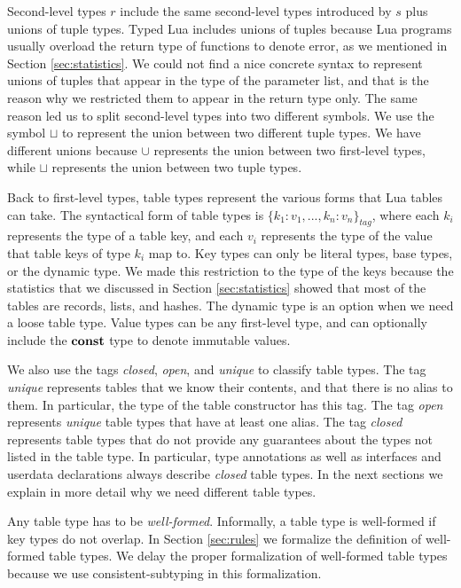 Second-level types $r$ include the same second-level types introduced
by $s$ plus unions of tuple types.
Typed Lua includes unions of tuples because Lua programs
usually overload the return type of functions to denote error,
as we mentioned in Section \ref{sec:statistics}.
We could not find a nice concrete syntax to represent unions of
tuples that appear in the type of the parameter list, and
that is the reason why we restricted them to appear in the return type only.
The same reason led us to split second-level types into two
different symbols.
We use the symbol $\sqcup$ to represent the union between two
different tuple types.
We have different unions because $\cup$ represents the union
between two first-level types, while $\sqcup$ represents the
union between two tuple types.

Back to first-level types, table types represent the various forms
that Lua tables can take.
The syntactical form of table types is $\{ k_{1}{:}v_{1}, ..., k_{n}{:}v_{n} \}_{tag}$,
where each $k_{i}$ represents the type of a table key,
and each $v_{i}$ represents the type of the value that table keys of type $k_{i}$ map to.
Key types can only be literal types, base types, or the dynamic type.
We made this restriction to the type of the keys because the statistics
that we discussed in Section \ref{sec:statistics} showed that most
of the tables are records, lists, and hashes.
The dynamic type is an option when we need a loose table type.
Value types can be any first-level type, and can optionally include
the $\mathbf{const}$ type to denote immutable values.

We also use the tags \emph{closed}, \emph{open}, and \emph{unique}
to classify table types.
The tag \emph{unique} represents tables that we know their contents,
and that there is no alias to them.
In particular, the type of the table constructor has this tag.
The tag \emph{open} represents \emph{unique} table types that
have at least one alias.
The tag \emph{closed} represents table types that do not provide
any guarantees about the types not listed in the table type.
In particular, type annotations as well as interfaces and userdata
declarations always describe \emph{closed} table types.
In the next sections we explain in more detail why we need
different table types.

Any table type has to be \emph{well-formed}.
Informally, a table type is well-formed if key types do not overlap.
In Section \ref{sec:rules} we formalize the definition of well-formed table types.
We delay the proper formalization of well-formed table types because we use
consistent-subtyping in this formalization.

